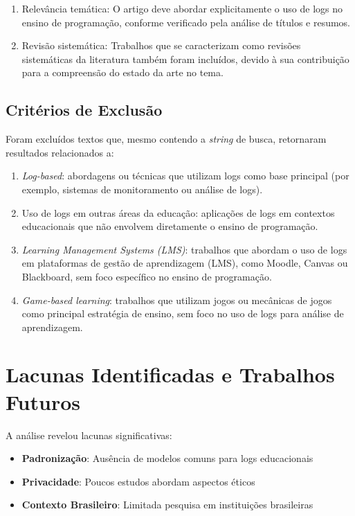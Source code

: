 \begin{enumerate}
    \item Relevância temática: O artigo deve abordar explicitamente o uso de logs no ensino de programação, conforme verificado pela análise de títulos e resumos.
    \item Revisão sistemática: Trabalhos que se caracterizam como revisões sistemáticas da literatura também foram incluídos, devido à sua contribuição para a compreensão do estado da arte no tema.
\end{enumerate}

\subsection{Critérios de Exclusão}\label{sub:criterios-exclusao}
Foram excluídos textos que, mesmo contendo a \textit{string} de busca, retornaram resultados relacionados a:

\begin{enumerate}
    \item \textit{Log-based}: abordagens ou técnicas que utilizam logs como base principal (por exemplo, sistemas de monitoramento ou análise de logs).
    \item Uso de logs em outras áreas da educação: aplicações de logs em contextos educacionais que não envolvem diretamente o ensino de programação.
    \item \textit{Learning Management Systems (LMS)}: trabalhos que abordam o uso de logs em plataformas de gestão de aprendizagem (LMS), como Moodle, Canvas ou Blackboard, sem foco específico no ensino de programação.
    \item \textit{Game-based learning}: trabalhos que utilizam jogos ou mecânicas de jogos como principal estratégia de ensino, sem foco no uso de logs para análise de aprendizagem.
\end{enumerate}

\section{Lacunas Identificadas e Trabalhos Futuros}\label{sec:lacunas-identificadas}

A análise revelou lacunas significativas:
\begin{itemize}
    \item \textbf{Padronização}: Ausência de modelos comuns para logs educacionais
    \item \textbf{Privacidade}: Poucos estudos abordam aspectos éticos
    \item \textbf{Contexto Brasileiro}: Limitada pesquisa em instituições brasileiras
\end{itemize}
